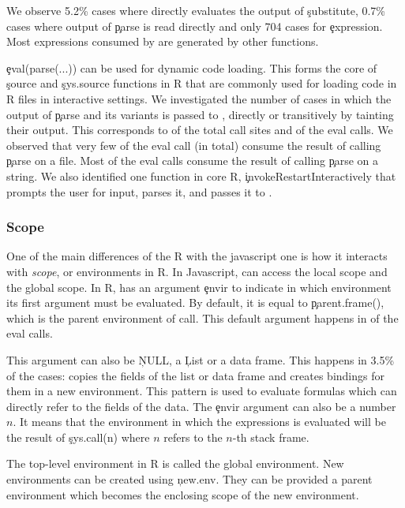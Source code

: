 \documentclass[USenglish,cleveref, autoref, thm-restate]{lipics-v2019}
\begin{document}
We observe 5.2\% cases where \eval directly evaluates the output of
\c{substitute}, 0.7\% cases where output of \c{parse} is read directly
and only 704 cases for \c{expression}. Most expressions consumed by
\eval are generated by other functions.

\c{eval(parse(...))} can be used for dynamic code loading. This forms
the core of \c{source} and \c{sys.source} functions in R that are
commonly used for loading code in R files in interactive settings. We
investigated the number of cases in which the output of \c{parse} and
its variants is passed to \eval, directly or transitively by tainting
their output. This corresponds to \PercentParsedCallSites of the total
\eval call sites and \PercentParsedEvals of the eval calls. We
observed that very few of the eval call (\NbParseFilesRnd in total)
consume the result of calling \c{parse} on a file. Most of the eval
calls consume the result of calling \c{parse} on a string. We also
identified one function in core R, \c{invokeRestartInteractively} that
prompts the user for input, parses it, and passes it to \eval.


\subsubsection{Scope}

One of the main differences of the R \eval with the javascript one is
how it interacts with \emph{scope}, or environments in R. In
Javascript, \eval can access the local scope and the global scope. In
R, \eval has an argument \c{envir} to indicate in which environment
its first argument must be evaluated. By default, it is equal to
\c{parent.frame()}, which is the parent environment of \eval call.
This default argument happens in \DefaultEnvirExprPercent of the eval
calls.

This argument can also be \c{NULL}, a \c{List} or a data frame. This
happens in 3.5\% of the cases: \eval copies the fields of the list or
data frame and creates bindings for them in a new environment. This
pattern is used to evaluate formulas which can directly refer to the
fields of the data. The \c{envir} argument can also be a number $n$.
It means that the environment in which the expressions is evaluated
will be the result of \c{sys.call(n)} where $n$ refers to the $n$-th
stack frame.

The top-level environment in R is called the global environment. New
environments can be created using \c{new.env}. They can be provided a
parent environment which becomes the enclosing scope of the new
environment.
\end{document}
